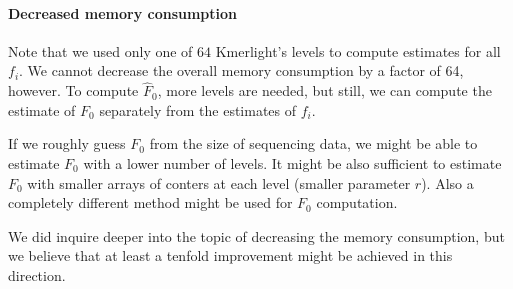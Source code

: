 \paragraph{Decreased memory consumption}
Note that we used only one of $64$ Kmerlight's levels to compute estimates for all $f_i$.
We cannot decrease the overall memory consumption by a factor of 64, however. 
To compute $\hat F_0$, more levels are needed, but still, we can compute the estimate
of $F_0$ separately from the estimates of $f_i$.

If we roughly guess $F_0$ from the size of sequencing data, we might be able
to estimate $F_0$ with a lower number of levels. It might be also sufficient
to estimate $F_0$ with smaller arrays of conters at each level (smaller parameter $r$).
Also a completely different method might be used for $F_0$ computation.

We did inquire deeper into the topic of decreasing the memory consumption,
but we believe that at least a tenfold improvement might be achieved in this direction.